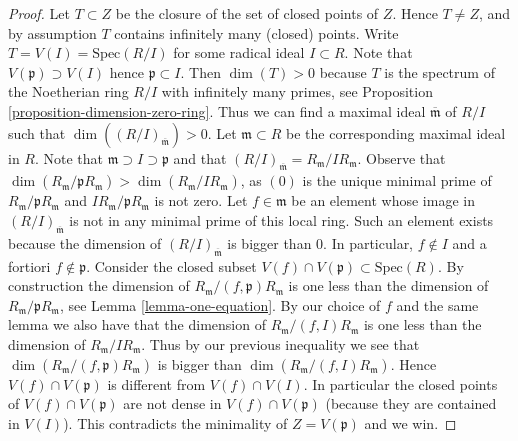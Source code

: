 \begin{proof}
\medskip\noindent
Let $T \subset Z$ be the closure of the set of closed
points of $Z$. Hence $T \not = Z$, and by assumption
$T$ contains infinitely many (closed) points.
Write $T = V(I) = \text{Spec}(R/I)$ for some radical
ideal $I \subset R$. Note that
$V(\mathfrak p) \supset V(I)$ hence $\mathfrak p \subset I$.
Then $\dim(T) > 0$ because $T$ is the spectrum
of the Noetherian ring $R/I$ with infinitely many primes,
see Proposition \ref{proposition-dimension-zero-ring}. 
Thus we can find a maximal ideal $\overline{\mathfrak m}$
of $R/I$ such that $\dim((R/I)_{\overline{\mathfrak m}}) > 0$.
Let $\mathfrak m \subset R$ be the corresponding maximal
ideal in $R$. Note that $\mathfrak m \supset I \supset \mathfrak p$
and that $(R/I)_{\overline{\mathfrak m}} = R_{\mathfrak m}/IR_{\mathfrak m}$.
Observe that $\dim(R_{\mathfrak m}/\mathfrak pR_{\mathfrak m}) >
\dim(R_{\mathfrak m}/IR_{\mathfrak m})$, as $(0)$ is the
unique minimal prime of $R_{\mathfrak m}/\mathfrak pR_{\mathfrak m}$
and $IR_{\mathfrak m}/\mathfrak pR_{\mathfrak m}$ is not zero.
Let $f \in \mathfrak m$ be an element
whose image in $(R/I)_{\overline{\mathfrak m}}$ is not
in any minimal prime of this local ring. Such an element
exists because the dimension of $(R/I)_{\overline{\mathfrak m}}$
is bigger than $0$. In particular,
$f \not \in I$ and a fortiori $f \not \in \mathfrak p$.
Consider the closed subset $V(f) \cap V(\mathfrak p)
\subset \text{Spec}(R)$. By construction 
the dimension of $R_{\mathfrak m}/(f, \mathfrak p)R_{\mathfrak m}$
is one less than the dimension of
$R_{\mathfrak m}/\mathfrak pR_{\mathfrak m}$,
see Lemma \ref{lemma-one-equation}. By our
choice of $f$
and the same lemma
we also have that the dimension
of $R_{\mathfrak m}/(f, I)R_{\mathfrak m}$
is one less than the dimension of $R_{\mathfrak m}/IR_{\mathfrak m}$.
Thus by our previous inequality we see
that $\dim(R_{\mathfrak m}/(f, \mathfrak p)R_{\mathfrak m})$
is bigger than $\dim(R_{\mathfrak m}/(f, I)R_{\mathfrak m})$.
Hence $V(f) \cap V(\mathfrak p)$ is
different from $V(f) \cap V(I)$. In particular the
closed points of $V(f) \cap V(\mathfrak p)$ are
not dense in $V(f) \cap V(\mathfrak p)$ (because they
are contained in $V(I)$). This contradicts the minimality
of $Z = V(\mathfrak p)$ and we win.
\end{proof}






















